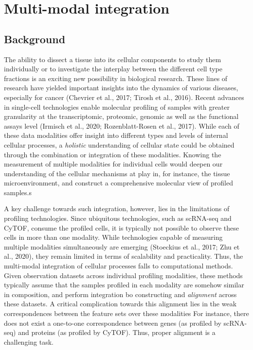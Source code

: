 \chapter{Multi-modal integration}
\section{Background}
The ability to dissect a tissue into its cellular components to study them individually or to investigate the interplay between the different cell type fractions is an exciting new possibility in biological research.
These lines of research have yielded important insights into the dynamics of various diseases, especially for cancer (Chevrier et al., 2017; Tirosh et al., 2016).
Recent advances in single-cell technologies enable molecular profiling of samples with greater granularity at the transcriptomic, proteomic, genomic as well as the functional assays level (Irmisch et al., 2020; Rozenblatt-Rosen et al., 2017).
While each of these data modalities offer insight into different types and levels of internal cellular processes,
a \textit{holistic} understanding of cellular state could be obtained through the combination or integration of these modalities.
Knowing the measurement of multiple modalities for individual cells would deepen our understanding of the cellular mechanisms at play in, for instance, the tissue microenvironment, and construct a comprehensive molecular view of profiled samples.s

A key challenge towards such integration, however, lies in the limitations of profiling technologies.
Since ubiquitous technologies, such as scRNA-seq and CyTOF, consume the profiled cells, it is typically not possible to observe these cells in more than one modality.
While technologies capable of measuring multiple modalities simultaneously are emerging (Stoeckius et al., 2017; Zhu et al., 2020), they remain limited in terms of scalability and practicality.
Thus, the multi-modal integration of cellular processes falls to computational methods.
Given observation datasets across individual profiling modalities, these methods typically assume that the samples profiled in each modality are somehow similar in composition, and perform integration bo constructing and \textit{alignment} across these datasets.
A critical complication towards this alignment lies in the weak correspondences between the feature sets over these modalities
For instance, there does not exist a one-to-one correspondence between genes (as profiled by scRNA-seq) and proteins (as profiled by CyTOF).
Thus, proper alignment is a challenging task.

